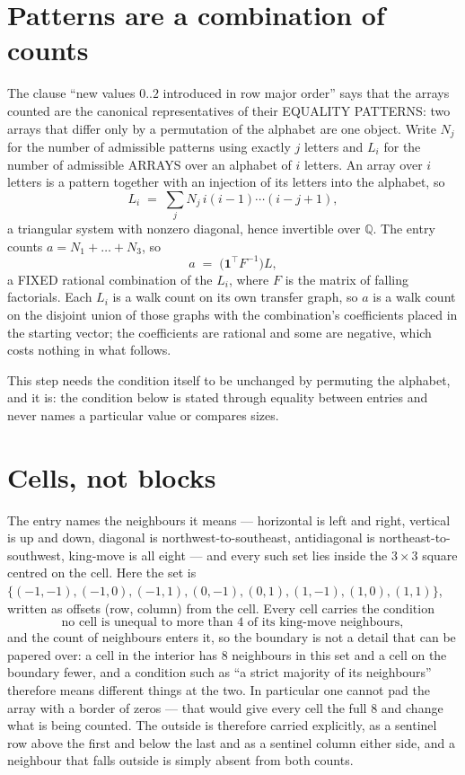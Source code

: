 \documentclass[11pt,a4paper]{article}
\theoremstyle{plain}
\theoremstyle{definition}
\begin{document}
\section{Patterns are a combination of counts}

The clause ``new values $0..2$ introduced in row major order'' says that the arrays
counted are the canonical representatives of their EQUALITY PATTERNS: two arrays that differ
only by a permutation of the alphabet are one object. Write $N_j$ for the number of admissible
patterns using exactly $j$ letters and $L_i$ for the number of admissible ARRAYS over an
alphabet of $i$ letters. An array over $i$ letters is a pattern together with an injection of
its letters into the alphabet, so
\[
L_i\;=\;\sum_{j}N_j\,i(i-1)\cdots(i-j+1),
\]
a triangular system with nonzero diagonal, hence invertible over $\mathbb{Q}$. The entry
counts $a=N_1+\dots+N_{3}$, so
\[
a\;=\;\bigl(\mathbf{1}^{\!\top}F^{-1}\bigr)L ,
\]
a FIXED rational combination of the $L_i$, where $F$ is the matrix of falling factorials.
Each $L_i$ is a walk count on its own transfer graph, so $a$ is a walk count on the disjoint
union of those graphs with the combination's coefficients placed in the starting vector; the
coefficients are rational and some are negative, which costs nothing in what follows.

This step needs the condition itself to be unchanged by permuting the alphabet, and it is:
the condition below is stated through equality between entries and never names a particular
value or compares sizes.

\section{Cells, not blocks}

The entry names the neighbours it means --- horizontal is left and right, vertical is up and
down, diagonal is northwest-to-southeast, antidiagonal is northeast-to-southwest, king-move is
all eight --- and every such set lies inside the $3\times3$ square centred on the cell. Here
the set is $\{(-1,-1), (-1,0), (-1,1), (0,-1), (0,1), (1,-1), (1,0), (1,1)\}$, written as offsets (row, column) from the cell. Every cell carries
the condition
\[
\text{no cell is unequal to more than 4 of its king-move neighbours},
\]
and the count of neighbours enters it, so the boundary is not a detail that can be papered
over: a cell in the interior has $8$ neighbours in this set and a cell on the boundary
fewer, and a condition such as ``a strict majority of its neighbours'' therefore means
different things at the two. In particular one cannot pad the array with a border of zeros ---
that would give every cell the full $8$ and change what is being counted. The outside is
therefore carried
explicitly, as a sentinel row above the first and below the last and as a sentinel column
either side, and a neighbour that falls outside is simply absent from both counts.
\end{document}
